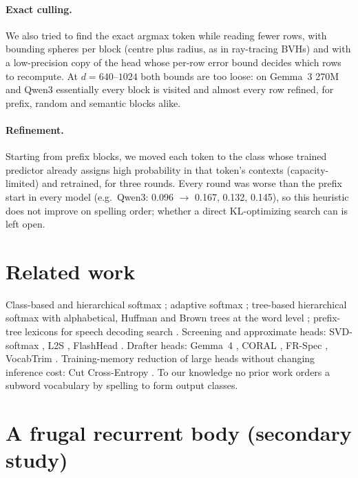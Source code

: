\documentclass[11pt]{article}
\begin{document}
\paragraph{Exact culling.} We also tried to find the exact argmax token while reading fewer rows, with bounding spheres per block (centre plus radius, as in ray-tracing BVHs) and with a low-precision copy of the head whose per-row error bound decides which rows to recompute. At $d=640$--$1024$ both bounds are too loose: on Gemma~3 270M and Qwen3 essentially every block is visited and almost every row refined, for prefix, random and semantic blocks alike.

\paragraph{Refinement.} Starting from prefix blocks, we moved each token to the class whose trained predictor already assigns high probability in that token's contexts (capacity-limited) and retrained, for three rounds. Every round was worse than the prefix start in every model (e.g.\ Qwen3: 0.096 $\to$ 0.167, 0.132, 0.145), so this heuristic does not improve on spelling order; whether a direct KL-optimizing search can is left open.

\section{Related work}

Class-based and hierarchical softmax \citep{goodman2001classes,morin2005hierarchical,mikolov2011extensions}; adaptive softmax \citep{grave2017adaptive}; tree-based hierarchical softmax with alphabetical, Huffman and Brown trees at the word level \citep{jiang2017}; prefix-tree lexicons for speech decoding search \citep{ney1992}. Screening and approximate heads: SVD-softmax \citep{shim2017svd}, L2S \citep{chen2019l2s}, FlashHead \citep{flashhead}. Drafter heads: Gemma~4 \citep{gemma4}, CORAL \citep{coral}, FR-Spec \citep{frspec}, VocabTrim \citep{vocabtrim}. Training-memory reduction of large heads without changing inference cost: Cut Cross-Entropy \citep{wijmans2025cut}. To our knowledge no prior work orders a subword vocabulary by spelling to form output classes.

\section{A frugal recurrent body (secondary study)}\label{sec:quartzo}
\end{document}
